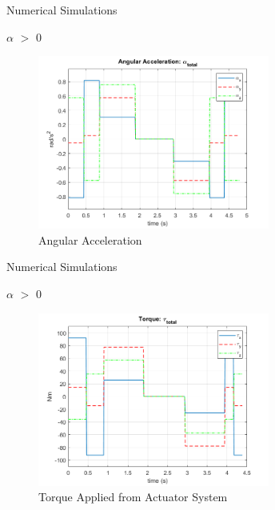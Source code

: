 \documentclass{beamer}
\begin{document}
\begin{frame}{Numerical Simulations}
	\begin{block}{$\alpha$ $>$ 0}
		
		\begin{figure}[H]
			\label{fig:ang_accel_total}
			\begin{center}
				\includegraphics[width=3in]{figures/alphaNot0/ang_accel_total.png}
			\end{center}
			\caption{Angular Acceleration}
		\end{figure}
		
	\end{block}
\end{frame}
\begin{frame}{Numerical Simulations}
\begin{block}{$\alpha$ $>$ 0}
	
	\begin{figure}[H]
		\label{fig:torque_total}
		\begin{center}
			\includegraphics[width=3in]{figures/alphaNot0/torque_total.png}
		\end{center}
		\caption{Torque Applied from Actuator System}
	\end{figure}
	
\end{block}
\end{frame}
\end{document}
